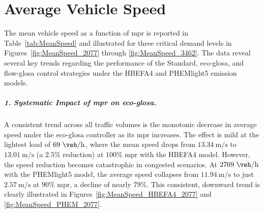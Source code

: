 \section{Average Vehicle Speed}
\label{sec:Results_MeanSpeed}

The mean vehicle speed as a function of \ac{mpr} is reported in Table~\vref{tab:MeanSpeed} and illustrated for three critical demand levels in Figures~\vref{fig:MeanSpeed_2077} through \vref{fig:MeanSpeed_3462}. The data reveal several key trends regarding the performance of the Standard, \ac{eco-glosa}, and \ac{flow-glosa} control strategies under the HBEFA4 and PHEMlight5 emission models.

\subparagraph*{1. Systematic Impact of \ac{mpr} on \ac{eco-glosa}.}
A consistent trend across all traffic volumes is the monotonic decrease in average speed under the \ac{eco-glosa} controller as its \ac{mpr} increases. The effect is mild at the lightest load of $69~\unit{\veh\per\hour}$, where the mean speed drops from $13.34~\unit{\metre\per\second}$ to $13.01~\unit{\metre\per\second}$ (a $2.5\%$ reduction) at $100\%$ \ac{mpr} with the HBEFA4 model. However, the speed reduction becomes catastrophic in congested scenarios. At $2769~\unit{\veh\per\hour}$ with the PHEMlight5 model, the average speed collapses from $11.94~\unit{\metre\per\second}$ to just $2.57~\unit{\metre\per\second}$ at $90\%$ \ac{mpr}, a decline of nearly $79\%$. This consistent, downward trend is clearly illustrated in Figures~\vref{fig:MeanSpeed_HBEFA4_2077} and \vref{fig:MeanSpeed_PHEM_2077}.

